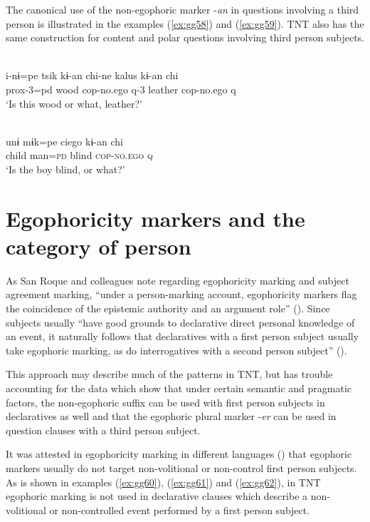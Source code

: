 \documentclass[output=paper]{langsci/langscibook}
\begin{document}
The canonical use of the non-egophoric marker -\textit{an} in questions involving a third person is illustrated in the examples (\ref{ex:gg58}) and (\ref{ex:gg59}). TNT also has the same construction for content and polar questions involving third person subjects.


\ea \label{ex:gg58}
\\
	\gll i-nɨ=pe	tsik	kɨ-an	chi-ne	kalus	kɨ-an	chi\\
	prox-3=pd	wood	cop-no.ego	q-3	leather	cop-no.ego	q\\
	\glt ‘Is this wood or what, leather?’
\z



\ea \label{ex:gg59}
\\
	\gll unɨ	mɨk=pe	ciego	kɨ-an	chi\\
	child	man=\textsc{pd}	blind	\textsc{cop-no.ego}	\textsc{q}\\
	\glt ‘Is the boy blind, or what?’
\z


\section{Egophoricity markers and the category of person}\label{s:gg4}

As San Roque and colleagues note regarding egophoricity marking and subject agreement marking, “under a person-marking account, egophoricity markers flag the coincidence of the epistemic authority and an argument role” (\citealt[33]{SanRoque2018}). Since subjects usually “have good grounds to declarative direct personal knowledge of an event, it naturally follows that declaratives with a first person subject usually take egophoric marking, as do interrogatives with a second person subject” (\citealt[33]{SanRoque2018}).

This approach may describe much of the patterns in TNT, but has trouble accounting for the data which show that under certain semantic and pragmatic factors, the non-egophoric suffix can be used with first person subjects in declaratives as well and that the egophoric plural marker -\textit{er} can be used in question clauses with a third person subject.

It was attested in egophoricity marking in different languages (\citealt{SanRoque2018}) that egophoric markers usually do not target non-volitional or non-control first person subjects. As is shown in examples (\ref{ex:gg60}), (\ref{ex:gg61}) and (\ref{ex:gg62}), in TNT egophoric marking is not used in declarative clauses which describe a non-volitional or non-controlled event performed by a first person subject.
\end{document}
